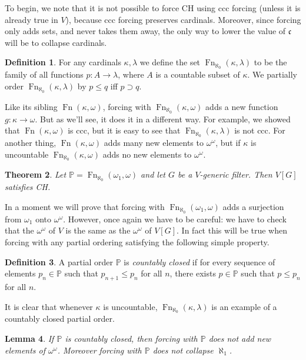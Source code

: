 \documentclass[11pt,oneside,a4paper]{amsbook}
\newcommand{\PP}{\mathbb P}
\DeclareMathOperator{\Fn}{Fn}
\theoremstyle{definition}
\theoremstyle{plain}
\newtheorem{theorem}{Theorem}[section]
\newtheorem{lemma}[theorem]{Lemma}
\theoremstyle{definition}
\newtheorem{definition}[theorem]{Definition}
\theoremstyle{remark}
\numberwithin{equation}{section}
\numberwithin{figure}{section}
\begin{document}
To begin, we note that it is not possible to force CH using ccc forcing (unless it is already true in $V$), because ccc forcing preserves cardinals. Moreover, since forcing only adds sets, and never takes them away, the only way to lower the value of $\mathfrak c$ will be to collapse cardinals.

\begin{definition}
  For any cardinals $\kappa,\lambda$ we define the set $\Fn_{\aleph_0}(\kappa,\lambda)$ to be the family of all functions $p\colon A\to\lambda$, where $A$ is a countable subset of $\kappa$. We partially order $\Fn_{\aleph_0}(\kappa,\lambda)$ by $p\leq q$ iff $p\supset q$.
\end{definition}

Like its sibling  $\Fn(\kappa,\omega)$, forcing with $\Fn_{\aleph_0}(\kappa,\omega)$ adds a new function $g\colon\kappa\to\omega$. But as we'll see, it does it in a different way. For example, we showed that $\Fn(\kappa,\omega)$ is ccc, but it is easy to see that $\Fn_{\aleph_0}(\kappa,\lambda)$ is not ccc. For another thing, $\Fn(\kappa,\omega)$ adds many new elements to $\omega^\omega$, but if $\kappa$ is uncountable $\Fn_{\aleph_0}(\kappa,\omega)$ adds no new elements to $\omega^\omega$.

\begin{theorem}
  \label{thm:force-ch}
  Let $\PP=\Fn_{\aleph_0}(\omega_1,\omega)$ and let $G$ be a $V$-generic filter. Then $V[G]$ satisfies CH.
\end{theorem}

In a moment we will prove that forcing with $\Fn_{\aleph_0}(\omega_1,\omega)$ adds a surjection from $\omega_1$ onto $\omega^\omega$. However, once again we have to be careful: we have to check that the $\omega^\omega$ of $V$ is the same as the $\omega^\omega$ of $V[G]$. In fact this will be true when forcing with any partial ordering satisfying the following simple property.

\begin{definition}
  A partial order $\PP$ is \emph{countably closed} if for every sequence of elements $p_n\in\PP$ such that $p_{n+1}\leq p_n$ for all $n$, there exists $p\in\PP$ such that $p\leq p_n$ for all $n$.
\end{definition}

It is clear that whenever $\kappa$ is uncountable, $\Fn_{\aleph_0}(\kappa,\lambda)$ is an example of a countably closed partial order.

\begin{lemma}
  \label{lem:forcing-closed-preserves}
  If $\PP$ is countably closed, then forcing with $\PP$ does not add new elements of $\omega^\omega$. Moreover forcing with $\PP$ does not collapse $\aleph_1$.
\end{lemma}
\end{document}
